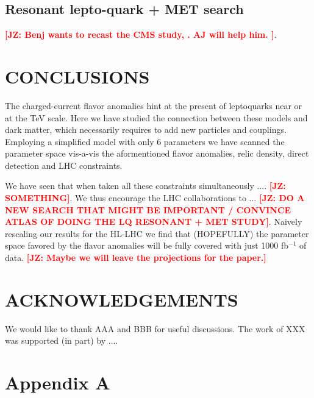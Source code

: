 \documentclass[11pt]{cernrep}
\def\JZ#1{{\bf  \textcolor{red}{[JZ: {#1}]}}}
\begin{document}
\subsection{Resonant lepto-quark + MET search}

\JZ{Benj wants to recast the CMS study, \cite{Sirunyan:2018xtm}. AJ will help him. }.


%
% 
 

\section{CONCLUSIONS}
The charged-current flavor anomalies hint at the present of leptoquarks near or at the TeV scale. Here we have studied the connection between these models and dark matter, which necessarily requires to add new particles and couplings. Employing a simplified model with only 6 parameters we have scanned the parameter space vis-a-vis the aformentioned flavor anomalies, relic density, direct detection and LHC constraints.

We have seen that when taken all these constraints simultaneously .... \JZ{SOMETHING}. We thus encourage the LHC collaborations to ... \JZ{DO A NEW SEARCH THAT MIGHT BE IMPORTANT / CONVINCE ATLAS OF DOING THE LQ RESONANT + MET STUDY}. Naively rescaling our results for the HL-LHC we find that (HOPEFULLY) the parameter space favored by the flavor anomalies will be fully covered with just 1000 fb$^{-1}$ of data. \JZ{Maybe we will leave the projections for the paper.}


\section*{ACKNOWLEDGEMENTS}
We would like to thank AAA and BBB for useful discussions.
The work of XXX was supported (in part) by ....



\appendix
\section{Appendix A}




\end{document}
